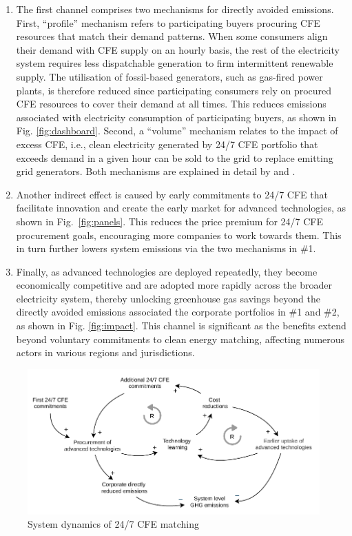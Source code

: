 \documentclass[pdflatex,sn-basic, Numbered]{sn-jnl}%
\theoremstyle{thmstyleone}%
\theoremstyle{thmstyletwo}%
\theoremstyle{thmstylethree}%
\begin{document}
\begin{enumerate}
    \item The first channel comprises two mechanisms for directly avoided emissions. First, \enquote{profile} mechanism refers to participating buyers procuring CFE resources that match their demand patterns. When some consumers align their demand with CFE supply on an hourly basis, the rest of the electricity system requires less dispatchable generation to firm intermittent renewable supply. The utilisation of fossil-based generators, such as gas-fired power plants, is therefore reduced since participating consumers rely on procured CFE resources to cover their demand at all times. This reduces emissions associated with electricity consumption of participating buyers, as shown in Fig. \ref{fig:dashboard}.
    Second, a \enquote{volume} mechanism relates to the impact of excess CFE, i.e., clean electricity generated by 24/7 CFE portfolio that exceeds demand in a given hour can be sold to the grid to replace emitting grid generators. Both mechanisms are explained in detail by \citet{xu-247CFE-report} and \citet{riepinMeansCostsSystemlevel2024}.
    \item Another indirect effect is caused by early commitments to 24/7 CFE that facilitate innovation and create the early market for advanced technologies, as shown in Fig.~\ref{fig:panels}. 
    This reduces the price premium for 24/7 CFE procurement goals, encouraging more companies to work towards them. This in turn further lowers system emissions via the two mechanisms in \#1.
    \item Finally, as advanced technologies are deployed repeatedly, they become economically competitive and are adopted more rapidly across the broader electricity system, thereby unlocking greenhouse gas savings beyond the directly avoided emissions associated the corporate portfolios in \#1 and \#2, as shown in Fig. \ref{fig:impact}. This channel is significant as the benefits extend beyond voluntary commitments to clean energy matching, affecting numerous actors in various regions and jurisdictions.
\end{enumerate}

\begin{figure}[h]
    \centering
    \includegraphics[width=1\textwidth]{images/virtuous_dynamics.pdf}
    \caption{System dynamics of 24/7 CFE matching}\label{fig:dynamics}
\end{figure}
\end{document}

